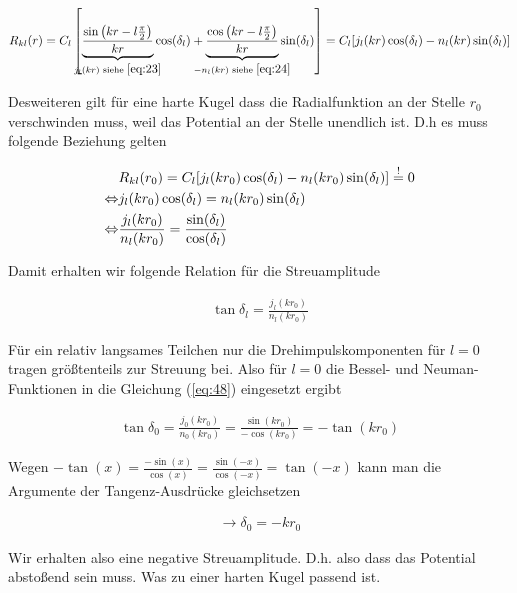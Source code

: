 \begin{align}
  \label{eq:46}
  R_{kl}(r) =  C_l \left[\underbr{\frac{\sin\left(kr-l\frac{\pi}{2}\right)}{kr}}_{j_l(kr) \text{ siehe }\eqref{eq:23}}\cos(\delta_l) + \underbr{\frac{\cos\left(kr-l\frac{\pi}{2}\right)}{kr}}_{-n_l(kr) \text{ siehe } \eqref{eq:24}}\sin(\delta_l)\right] =C_l [j_l(kr)\cos(\delta_l) -n_l(kr) \sin(\delta_l) ]
\end{align}

Desweiteren gilt für eine harte Kugel dass die Radialfunktion an der Stelle \(r_0\) verschwinden muss, weil das Potential an der Stelle unendlich ist. D.h es muss folgende Beziehung gelten

\begin{align}
  \label{eq:47}
   &R_{kl}(r_0) =C_l [j_l(kr_0)\cos(\delta_l) -n_l(kr_0) \sin(\delta_l) ] \stackrel{!}= 0 \notag\\
\Leftrightarrow &j_l(kr_0)\cos(\delta_l) = n_l(kr_0) \sin(\delta_l) \notag\\
\Leftrightarrow &\frac{ j_l(kr_0) }{n_l(kr_0)} = \frac{\sin(\delta_l)}{\cos(\delta_l)} \notag\\
\end{align}

Damit erhalten wir folgende Relation für die Streuamplitude

\begin{align}
  \label{eq:48}
  \tan\delta_l = \frac{ j_l(kr_0) }{n_l(kr_0)}
\end{align}

Für ein relativ langsames Teilchen nur die Drehimpulskomponenten für \(l=0\) tragen größtenteils zur Streuung bei. Also für \(l=0\) die Bessel- und Neuman-Funktionen in die Gleichung (\ref{eq:48}) eingesetzt ergibt

\begin{align}
  \label{eq:49}
  \tan\delta_0 = \frac{ j_0(kr_0) }{n_0(kr_0)} = \frac{ \sin(kr_0) }{-\cos(kr_0)} = -\tan(kr_0)
\end{align}

Wegen \(-\tan(x) = \frac{-\sin(x)}{\cos(x)} =\frac{\sin(-x)}{\cos(-x)} = \tan(-x) \) kann man die Argumente der Tangenz-Ausdrücke gleichsetzen

\begin{align}
  \label{eq:50}
  \boxed{ \rightarrow \delta_0 = - kr_0 }
\end{align}

Wir erhalten also eine negative Streuamplitude. D.h. also dass das Potential abstoßend sein muss. Was zu einer harten Kugel passend ist.


